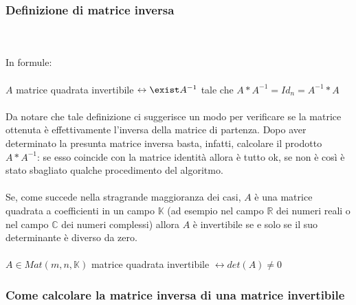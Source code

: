 \documentclass{report}
\begin{document}
\subsubsection{Definizione di matrice inversa}
\\
\\
In formule:
\\
\\
$A$ matrice quadrata invertibile $\leftrightarrow \exist A^{-1}$ tale che $A*A^{-1} = Id_n = A^{-1}*A$
\\
\\
Da notare che tale definizione ci suggerisce un modo per verificare se la matrice ottenuta è effettivamente l'inversa della matrice di partenza. Dopo aver determinato la presunta matrice inversa basta, infatti, calcolare il prodotto $A*A^{-1}$: se esso coincide con la matrice identità allora è tutto ok, se non è così è stato sbagliato qualche procedimento del algoritmo.
\\
\\
Se, come succede nella stragrande maggioranza dei casi, $A$ è una matrice quadrata a coefficienti in un campo $\mathbb{K}$ (ad esempio nel campo $\mathbb{R}$ dei numeri reali o nel campo $\mathbb{C}$ dei numeri complessi) allora $A$ è invertibile se e solo se il suo determinante è diverso da zero.
\\
\\
$A \in Mat(m,n,\mathbb{K})$ matrice quadrata invertibile $\leftrightarrow det(A) \neq 0$

\subsubsection{Come calcolare la matrice inversa di una matrice invertibile}
\end{document}
